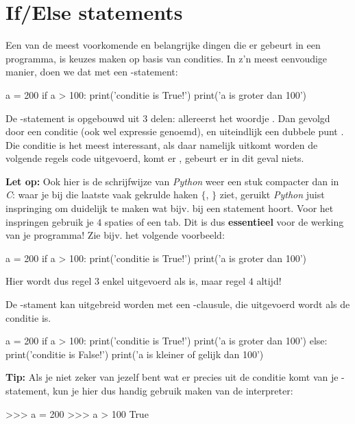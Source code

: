 \section{If/Else statements}
Een van de meest voorkomende en belangrijke dingen die er gebeurt in een programma, is keuzes maken op basis van condities. In z'n meest eenvoudige manier, doen we dat met een -statement:
\begin{python}
a = 200
if a > 100:
	print('conditie is True!')
	print('a is groter dan 100')
\end{python}
De -statement is opgebouwd uit $3$ delen: allereerst het woordje . Dan gevolgd door een conditie (ook wel expressie genoemd), en uiteindlijk een dubbele punt \pyth{:}. Die conditie is het meest interessant, als daar namelijk  uitkomt worden de volgende regels code uitgevoerd, komt er , gebeurt er in dit geval niets. 

\begin{remark}
\textbf{Let op:} Ook hier is de schrijfwijze van \textit{Python} weer een stuk compacter dan in \textit{C}: waar je bij die laatste vaak gekrulde haken $\{$, $\}$ ziet, geruikt \textit{Python} juist inspringing om duidelijk te maken wat bijv. bij een statement hoort. Voor het inspringen gebruik je $4$ spaties of een tab. Dit is dus \textbf{essentieel} voor de werking van je programma! Zie bijv. het volgende voorbeeld:
\begin{python}
a = 200
if a > 100:
	print('conditie is True!')
print('a is groter dan 100')
\end{python}
Hier wordt dus regel $3$ enkel uitgevoerd als  is, maar regel $4$ altijd!
\end{remark}

De -stament kan uitgebreid worden met een -clausule, die uitgevoerd wordt als de conditie  is.
\begin{python}
a = 200
if a > 100:
	print('conditie is True!')
	print('a is groter dan 100')
else:
	print('conditie is False!')
	print('a is kleiner of gelijk dan 100')
\end{python}

\newpage

\textbf{Tip:} Als je niet zeker van jezelf bent wat er precies uit de conditie komt van je -statement, kun je hier dus handig gebruik maken van de interpreter:
\begin{python}
>>> a = 200
>>> a > 100
True
\end{python}

